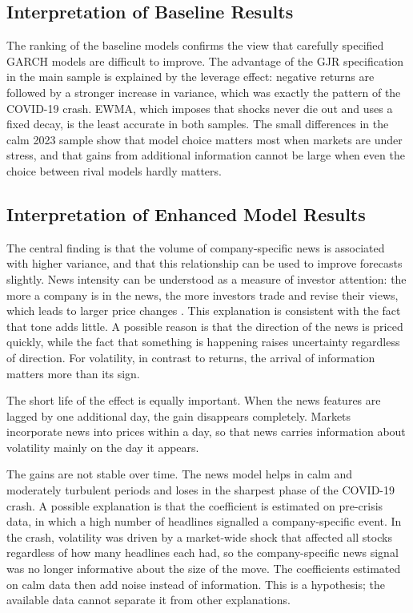 \documentclass[12pt,a4paper]{article}
\begin{document}
\subsection{Interpretation of Baseline Results}\label{sec:disc-baseline}
The ranking of the baseline models confirms the view that carefully specified GARCH models are difficult to improve. The advantage of the GJR specification in the main sample is explained by the leverage effect: negative returns are followed by a stronger increase in variance, which was exactly the pattern of the COVID-19 crash. EWMA, which imposes that shocks never die out and uses a fixed decay, is the least accurate in both samples. The small differences in the calm 2023 sample show that model choice matters most when markets are under stress, and that gains from additional information cannot be large when even the choice between rival models hardly matters.

\subsection{Interpretation of Enhanced Model Results}\label{sec:disc-enhanced}
The central finding is that the volume of company-specific news is associated with higher variance, and that this relationship can be used to improve forecasts slightly. News intensity can be understood as a measure of investor attention: the more a company is in the news, the more investors trade and revise their views, which leads to larger price changes \parencite{barber2008}. This explanation is consistent with the fact that tone adds little. A possible reason is that the direction of the news is priced quickly, while the fact that something is happening raises uncertainty regardless of direction. For volatility, in contrast to returns, the arrival of information matters more than its sign.

The short life of the effect is equally important. When the news features are lagged by one additional day, the gain disappears completely. Markets incorporate news into prices within a day, so that news carries information about volatility mainly on the day it appears.

The gains are not stable over time. The news model helps in calm and moderately turbulent periods and loses in the sharpest phase of the COVID-19 crash. A possible explanation is that the coefficient is estimated on pre-crisis data, in which a high number of headlines signalled a company-specific event. In the crash, volatility was driven by a market-wide shock that affected all stocks regardless of how many headlines each had, so the company-specific news signal was no longer informative about the size of the move. The coefficients estimated on calm data then add noise instead of information. This is a hypothesis; the available data cannot separate it from other explanations.
\end{document}

